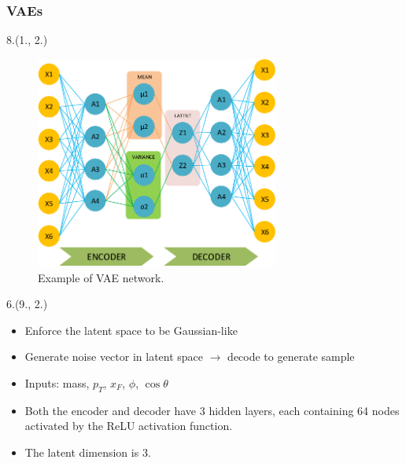 \documentclass[12pt, xcolor={dvipsnames}, aspectratio = 169, sans,mathserif]{beamer}
\newenvironment{List}[2]
{\begin{textblock}{#1}#2
\begin{itemize}}
{\end{itemize}
\end{textblock}}
\newenvironment{Pic}[2]
{\begin{textblock}{#1}#2
\begin{figure}}
{\end{figure}
\end{textblock}}
\begin{document}
\begin{frame}
\frametitle{VAEs}

\begin{Pic}{8.}{(1., 2.)}
    \includegraphics[width=8.0cm]{imgs/VAE.png}
    \caption{Example of VAE network.}
\end{Pic}

\begin{List}{6.}{(9., 2.)}

    \item Enforce the latent space to be Gaussian-like

    \item Generate noise vector in latent space $\rightarrow$ decode to generate sample

    \item Inputs: mass, $p_{T}$, $x_{F}$, $\phi$, $\cos\theta$

    \item Both the encoder and decoder have 3 hidden layers, each containing 64 nodes activated by the ReLU activation function.

    \item The latent dimension is 3.

\end{List}

\end{frame}
\end{document}
